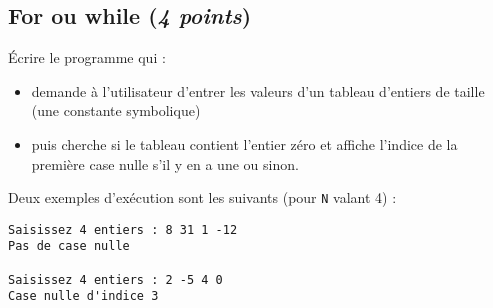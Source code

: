 \subsection{ For ou while (\textit{4 points})}

Écrire le programme qui :
\begin{itemize}
\item demande à l'utilisateur d'entrer les valeurs d'un tableau
  d'entiers de taille  (une constante symbolique)
\item puis cherche si le tableau contient l'entier zéro et affiche
  l'indice de la première case nulle s'il y en a une ou  sinon.
\end{itemize}
Deux exemples d'exécution sont les suivants (pour \verb|N| valant 4) :
\begin{small}
\begin{verbatim}
Saisissez 4 entiers : 8 31 1 -12
Pas de case nulle

Saisissez 4 entiers : 2 -5 4 0
Case nulle d'indice 3
\end{verbatim}
\end{small}

